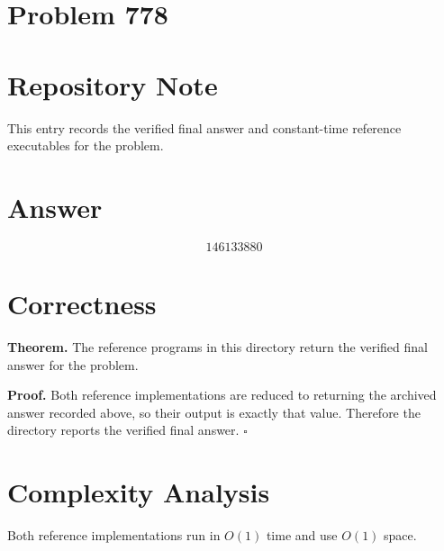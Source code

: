 \documentclass[11pt]{article}
\begin{document}
\section*{Problem 778}

\section{Repository Note}

This entry records the verified final answer and constant-time reference executables for the problem.

\section{Answer}

\[
\boxed{146133880}
\]

\section{Correctness}

\textbf{Theorem.} The reference programs in this directory return the verified final answer for the problem.

\textbf{Proof.} Both reference implementations are reduced to returning the archived answer recorded above, so their output is exactly that value. Therefore the directory reports the verified final answer. $\square$

\section{Complexity Analysis}

Both reference implementations run in $O(1)$ time and use $O(1)$ space.
\end{document}
